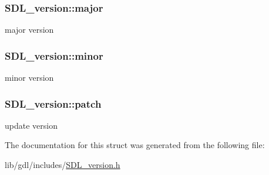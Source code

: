 \subsubsection[{major}]{ S\+D\+L\+\_\+version\+::major}\label{struct_s_d_l__version_ad7d7674532073eed237b90f546c97cd0}
major version \hypertarget{struct_s_d_l__version_a6c35c7bf80245028d5970e6a504ecf57}{}
\subsubsection[{minor}]{ S\+D\+L\+\_\+version\+::minor}\label{struct_s_d_l__version_a6c35c7bf80245028d5970e6a504ecf57}
minor version \hypertarget{struct_s_d_l__version_aa6dacff18edee8cd037c773b843be0f1}{}
\subsubsection[{patch}]{ S\+D\+L\+\_\+version\+::patch}\label{struct_s_d_l__version_aa6dacff18edee8cd037c773b843be0f1}
update version 

The documentation for this struct was generated from the following file\+:\begin{DoxyCompactItemize}
\item 
lib/gdl/includes/\hyperlink{_s_d_l__version_8h}{S\+D\+L\+\_\+version.\+h}\end{DoxyCompactItemize}
